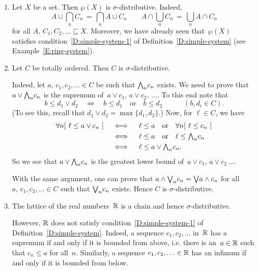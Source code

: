 \documentclass[main.tex]{subfiles}
\begin{document}
\begin{exs}
\begin{enumerate}
\item
Let $X$ be a set. Then $\wp(X)$ is $\sigma$-distributive.
Indeed,  
\begin{equation*}
\textstyle{
A \cup \bigcap_n C_n \,=\, \bigcap_n A \cup C_n
\qquad
A\cap \bigcup_n C_n \,=\, \bigcup_n A \cap C_n}
\end{equation*}
for all $A,\, C_1,C_2,\dotsc \subseteq X$.
Moreover,
we have already seen
that~$\wp(X)$ satisfies condition~\ref{D:simple-system-1}
of Definition~\ref{D:simple-system}
(see Example~\ref{E:ring-system}).
\item
Let $C$ be totally ordered. Then $C$ is $\sigma$-distributive.

Indeed,
let $a,\,c_1,c_2,\dotsc \in C$ be such that $\textstyle{\bigwedge}_n c_n$
exists. We need to prove that $a \vee \textstyle{\bigwedge}_n c_n$
is the supremum of~$a\vee c_1,\,a\vee c_2,\,\dotsc$.
To this end note that 
\begin{equation*}
b \leq d_1 \vee d_2 \quad\iff\quad 
b\leq d_1\quad\text{or}\quad b\leq d_2
\qquad\quad(b,d_i\in C).
\end{equation*}
(To see this, recall that $d_1 \vee d_2 = \max\{d_1,d_2\}$.)
Now, for $\ell \in C$, we have
\begin{alignat*}{3}
\forall n [\ \ell \leq a \vee c_n \ ]
\quad&\iff\quad
\ell \leq a
    \quad\text{or}\quad
    \forall n[\ \ell \leq c_n\ ] \\
\quad&\iff\quad
\ell \leq a
    \quad\text{or}\quad
    \ell \leq \textstyle{\bigwedge}_n c_n \\
\quad&\iff\quad
\ell \leq a\vee \textstyle{\bigwedge}_n c_n.
\end{alignat*}
So we see 
that $a\vee\textstyle{\bigwedge}_n c_n$ is the greatest 
lower bound of~$a\vee c_1,\,a\vee c_2\,\dotsc$.

With the same argument,
one can prove that $a \wedge \textstyle{\bigvee}_n c_n = \textstyle{\bigvee} a \wedge c_n$
for all $a,\,c_1,c_2,\dotsc \in C$
such that $\textstyle{\bigvee}_n c_n$ exists.
Hence $C$ is $\sigma$-distributive.

\item
The lattice of the real numbers~$\mathbb{R}$ is a chain
and hence $\sigma$-distributive.

However,
$\mathbb{R}$ does not satisfy condition~\ref{D:simple-system-1}
of Definition~\ref{D:simple-system}.
Indeed,
a sequence $c_1,c_2,\dotsc$ in~$\mathbb{R}$ has a supremum
if and only if it is bounded from above,
i.e. there is an~$a\in \mathbb{R}$ such that $c_n \leq a$
for all~$n$.
Similarly,
a sequence
$c_1,c_2,\dotsc\in \mathbb{R}$ has an infimum
if and only if it is bounded from below.


\end{enumerate}
\end{exs}
\end{document}

